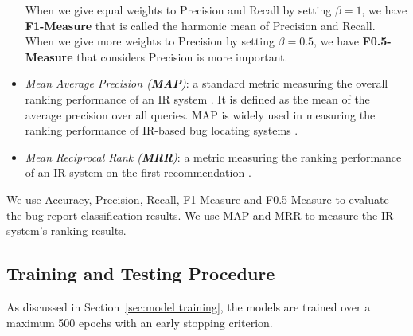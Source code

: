 \begin{itemize}
\begin{equation}
	\end{equation}
	When we give equal weights to Precision and Recall by setting $\beta=1$, we have \textbf{F1-Measure} that is called the harmonic mean of Precision and Recall.\\
	When we give more weights to Precision by setting $\beta=0.5$, we have \textbf{F0.5-Measure} that considers Precision is more important.
   \item \textit{Mean Average Precision (\textbf{MAP})}: a standard metric measuring the overall ranking performance of an IR system \cite{Manning:2008:IIR:1394399}. It is defined as the mean of the average precision over all queries. MAP is widely used in measuring the ranking performance of IR-based bug locating systems \cite{Huo:2017:EUF:3172077.3172153, Huo:2016:LUF:3060832.3060845, 7372035, Saha:2013:ASE:6693093, Ye:FSE14, Ye:ICSE16, Zhou:2012:BFM:2337223.2337226}.
   \item \textit{Mean Reciprocal Rank (\textbf{MRR})}: a metric measuring the ranking performance of an IR system on the first recommendation \cite{Voorhees99thetrec-8}.
\end{itemize}

We use Accuracy, Precision, Recall, F1-Measure and F0.5-Measure to evaluate the bug report classification results. We use MAP and MRR to measure the IR system's ranking results.

\subsection{Training and Testing Procedure}
\label{sec:training and testing procedure}
As discussed in Section~\ref{sec:model training}, the models are trained over a maximum 500 epochs with an early stopping criterion.


